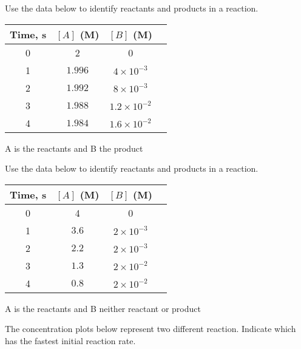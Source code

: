 \documentclass[main.tex]{subfiles}
\begin{document}
\begin{multicols*}{2}
\begin{question}[ID=\the\value{numA}]
Use the data below to identify reactants and products in a reaction.
\begin{center}\begin{tabular}[t]{  c c  c c     }
\toprule
Time, s	&	$[A]$ (M)	&		$[B]$ (M)	 \\
\midrule
0&	2	&	0	\\
1&	$1.996 $	&	$4\times 10^{-3}$	\\
2&	$1.992 $	&	$8\times 10^{-3}$	\\
3&	$1.988 $	&	$1.2\times 10^{-2}$	\\
4&	$1.984 $	&	$1.6\times 10^{-2}$	\\
\bottomrule
\end{tabular}\end{center}
\end{question}
\begin{solution}
A is the reactants and B the product
\hspace{0.1cm}\end{solution}%



\begin{question}[ID=\the\value{numA}]
Use the data below to identify reactants and products in a reaction.
\begin{center}\begin{tabular}[t]{  c c  c c     }
\toprule
Time, s	&	$[A]$ (M)	&		$[B]$ (M)	 \\
\midrule
0&	4	&	0	\\
1&	$3.6 $	&	$2\times 10^{-3}$	\\
2&	$2.2 $	&	$2\times 10^{-3}$	\\
3&	$1.3 $	&	$2\times 10^{-2}$	\\
4&	$0.8 $	&	$2\times 10^{-2}$	\\
\bottomrule
\end{tabular}\end{center}
\end{question}
\begin{solution}
A is the reactants and B neither reactant or product
\hspace{0.1cm}\end{solution}%


\begin{question}[ID=\the\value{numA}]
The concentration plots below represent two different reaction. Indicate which has the fastest initial reaction rate.\\
\begin{adjustbox}{width={8cm},totalheight={6cm},keepaspectratio}
  

\end{adjustbox}
\end{question}
\end{multicols*}
\end{document}
